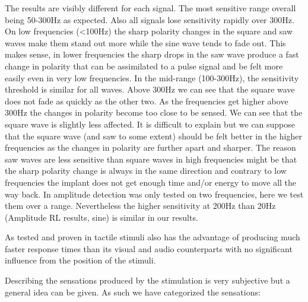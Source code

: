 \documentclass[10pt,journal,compsoc]{IEEEtran}
\begin{document}
	The results are visibly different for each signal. The most sensitive range overall being 50-300Hz as expected. Also all signals lose sensitivity rapidly over 300Hz.
	On low frequencies (<100Hz) the sharp polarity changes in the square and saw waves make them stand out more while the sine wave tends to fade out. This makes sense, in lower frequencies the sharp drops in the saw wave produce a fast change in polarity that can be assimilated to a pulse signal and be felt more easily even in very low frequencies.
	In the mid-range (100-300Hz), the sensitivity threshold is similar for all waves.
	Above 300Hz we can see that the square wave does not fade as quickly as the other two.
	As the frequencies get higher above 300Hz the changes in polarity become too close to be sensed. We can see that the square wave is slightly less affected. It is difficult to explain but we can suppose that the square wave (and saw to some extent) should be felt better in the higher frequencies as the changes in polarity are further apart and sharper.
	The reason saw waves are less sensitive than square waves in high frequencies might be that the sharp polarity change is always in the same direction and contrary to low frequencies the implant does not get enough time and/or energy to move all the way back.
	In \cite{harrison2018tf} amplitude detection was only tested on two frequencies, here we test them over a range. Nevertheless the higher sensitivity at 200Hz than 20Hz (Amplitude RL results, sine) is similar in our results.
	
	As tested and proven in \cite{chan2012lnecs} tactile stimuli also has the advantage of producing much faster response times than its visual and audio counterparts with no significant influence from the position of the stimuli.
	
	Describing the sensations produced by the stimulation is very subjective but a general idea can be given. As such we have categorized the sensations:
	
\end{document}
